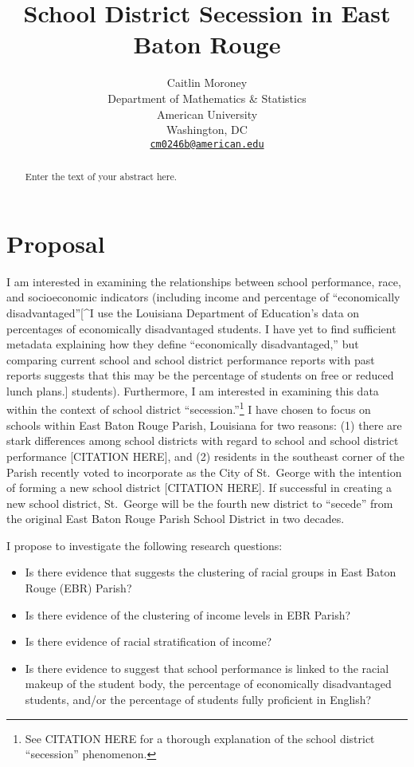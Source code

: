 \documentclass{article}
\title{School District Secession in East Baton Rouge}
\author{
    Caitlin Moroney
   \\
    Department of Mathematics \& Statistics \\
    American University \\
  Washington, DC \\
  \texttt{\href{mailto:cm0246b@american.edu}{\nolinkurl{cm0246b@american.edu}}} \\
  }
\begin{document}
\maketitle

\def\tightlist{}


\begin{abstract}
Enter the text of your abstract here.
\end{abstract}


\hypertarget{proposal}{%
\section{Proposal}\label{proposal}}

I am interested in examining the relationships between school
performance, race, and socioeconomic indicators (including income and
percentage of ``economically disadvantaged''{[}\^{}I use the Louisiana
Department of Education's data on percentages of economically
disadvantaged students. I have yet to find sufficient metadata
explaining how they define ``economically disadvantaged,'' but comparing
current school and school district performance reports with past reports
suggests that this may be the percentage of students on free or reduced
lunch plans.{]} students). Furthermore, I am interested in examining
this data within the context of school district ``secession.''\footnote{See
  CITATION HERE for a thorough explanation of the school district
  ``secession'' phenomenon.} I have chosen to focus on schools within
East Baton Rouge Parish, Louisiana for two reasons: (1) there are stark
differences among school districts with regard to school and school
district performance {[}CITATION HERE{]}, and (2) residents in the
southeast corner of the Parish recently voted to incorporate as the City
of St.~George with the intention of forming a new school district
{[}CITATION HERE{]}. If successful in creating a new school district,
St.~George will be the fourth new district to ``secede'' from the
original East Baton Rouge Parish School District in two decades.

I propose to investigate the following research questions:

\begin{itemize}
\tightlist
\item
  Is there evidence that suggests the clustering of racial groups in
  East Baton Rouge (EBR) Parish?
\item
  Is there evidence of the clustering of income levels in EBR Parish?
\item
  Is there evidence of racial stratification of income?
\item
  Is there evidence to suggest that school performance is linked to the
  racial makeup of the student body, the percentage of economically
  disadvantaged students, and/or the percentage of students fully
  proficient in English?
\end{itemize}
\end{document}
